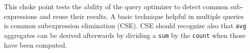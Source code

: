 
This choke point tests the ability of the query optimizer to detect common
sub-expressions and reuse their results. A basic technique helpful in multiple
queries is common subexpression elimination (CSE). CSE should recognize also
that \lstinline{avg} aggregates can be derived afterwards by dividing a
\lstinline{sum} by the \lstinline{count} when those have been computed.


